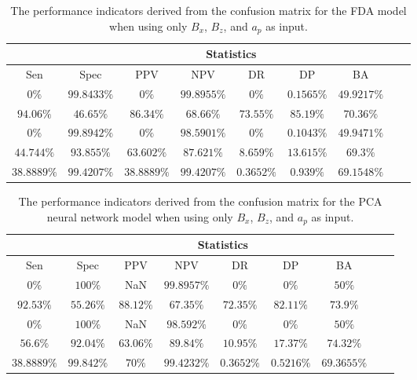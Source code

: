 \begin{table}[!ht]
	\centering
	\begin{tabular}{|c|c|c|c|c|c|c|c|c|}
		\hline
		 & \multicolumn{7}{c|}{Statistics} \\ \hline
		Sen & Spec & PPV & NPV & DR & DP & BA \\ \hline
		$0\%$ & $99.8433\%$ & $0\%$ & $99.8955\%$ & $0\%$ & $0.1565\%$ & $49.9217\%$ \\ \hline
		$94.06\%$ & $46.65\%$ & $86.34\%$ & $68.66\%$ & $73.55\%$ & $85.19\%$ & $70.36\%$ \\ \hline
		$0\%$ & $99.8942\%$ & $0\%$ & $98.5901\%$ & $0\%$ & $0.1043\%$ & $49.9471\%$ \\ \hline
		$44.744\%$ & $93.855\%$ & $63.602\%$ & $87.621\%$ & $8.659\%$ & $13.615\%$ & $69.3\%$ \\ \hline
		$38.8889\%$ & $99.4207\%$ & $38.8889\%$ & $99.4207\%$ & $0.3652\%$ & $0.939\%$ & $69.1548\%$ \\ \hline
	\end{tabular}
	\caption{The performance indicators derived from the confusion matrix for the FDA model when using only $B_{x}$, $B_{z}$, and $a_{p}$ as input.}
	\label{tab:cs:xzap:fda}
\end{table}

\begin{table}[!ht]
	\centering
	\begin{tabular}{|c|c|c|c|c|c|c|c|c|}
		\hline
		 & \multicolumn{7}{c|}{Statistics} \\ \hline
		Sen & Spec & PPV & NPV & DR & DP & BA \\ \hline
		$0\%$ & $100\%$ & NaN & $99.8957\%$ & $0\%$ & $0\%$ & $50\%$ \\ \hline
		$92.53\%$ & $55.26\%$ & $88.12\%$ & $67.35\%$ & $72.35\%$ & $82.11\%$ & $73.9\%$ \\ \hline
		$0\%$ & $100\%$ & NaN & $98.592\%$ & $0\%$ & $0\%$ & $50\%$ \\ \hline
		$56.6\%$ & $92.04\%$ & $63.06\%$ & $89.84\%$ & $10.95\%$ & $17.37\%$ & $74.32\%$ \\ \hline
		$38.8889\%$ & $99.842\%$ & $70\%$ & $99.4232\%$ & $0.3652\%$ & $0.5216\%$ & $69.3655\%$ \\ \hline
	\end{tabular}
	\caption{The performance indicators derived from the confusion matrix for the PCA neural network model when using only $B_{x}$, $B_{z}$, and $a_{p}$ as input.}
	\label{tab:cs:xzap:pcaNNet}
\end{table}

